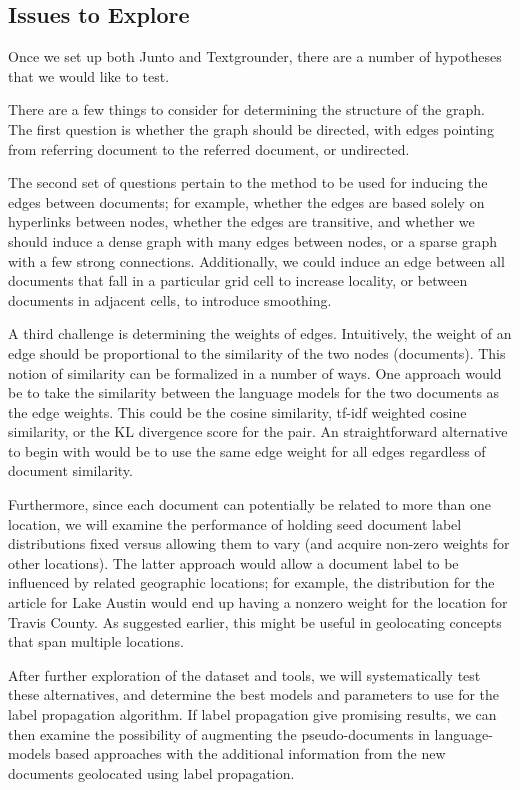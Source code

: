 \subsection{Issues to Explore}
Once we set up both Junto and Textgrounder, there are a number of hypotheses that we would like to test.

There are a few things to consider for determining the structure of the graph.
The first question is whether the graph should be directed, with edges pointing from referring document to the referred document, or undirected. 

The second set of questions pertain to the method to be used for inducing the edges between documents;
for example, whether the edges are based solely on hyperlinks between nodes, whether the edges are transitive, and whether we should induce a dense graph with many edges between nodes, or a sparse graph with a few strong connections.
Additionally, we could induce an edge between all documents that fall in a particular grid cell to increase locality, or between documents in adjacent cells, to introduce smoothing.

A third challenge is determining the weights of edges.
Intuitively, the weight of an edge should be proportional to the similarity of the two nodes (documents).
This notion of similarity can be formalized in a number of ways.
One approach would be to take the similarity between the language models for the two documents as the edge weights.
This could be the cosine similarity, tf-idf weighted cosine similarity, or the KL divergence score for the pair.
An straightforward alternative to begin with would be to use the same edge weight for all edges regardless of document similarity.
 
Furthermore, since each document can potentially be related to more than one
location, we will examine the performance of holding seed document label
distributions fixed versus allowing them to vary (and acquire non-zero weights
for other locations).
The latter approach would allow a document label to be influenced by related geographic locations; 
for example, the distribution for the article for Lake Austin would end up having a nonzero weight for the location for Travis County.
As suggested earlier, this might be useful in geolocating concepts that span multiple locations.

After further exploration of the dataset and tools, we will systematically test these alternatives, and determine the best models and parameters to use for the label propagation algorithm.
If label propagation give promising results, we can then examine the possibility of augmenting the pseudo-documents in language-models based approaches with the additional information from the new documents geolocated using label propagation.

